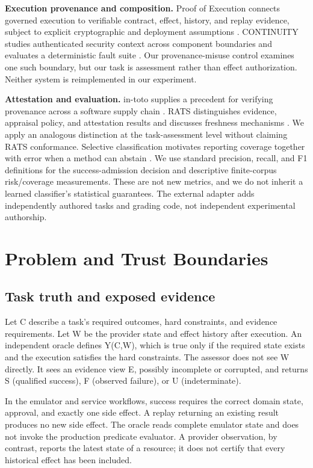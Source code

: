 \documentclass[11pt]{article}
\begin{document}
\textbf{Execution provenance and composition.} Proof of Execution connects governed execution to verifiable contract, effect, history, and replay evidence, subject to explicit cryptographic and deployment assumptions \cite{poe}. CONTINUITY studies authenticated security context across component boundaries and evaluates a deterministic fault suite \cite{continuity}. Our provenance-misuse control examines one such boundary, but our task is assessment rather than effect authorization. Neither system is reimplemented in our experiment.

\textbf{Attestation and evaluation.} in-toto supplies a precedent for verifying provenance across a software supply chain \cite{intoto}. RATS distinguishes evidence, appraisal policy, and attestation results and discusses freshness mechanisms \cite{rats}. We apply an analogous distinction at the task-assessment level without claiming RATS conformance. Selective classification motivates reporting coverage together with error when a method can abstain \cite{selective}. We use standard precision, recall, and F1 definitions \cite{metrics} for the success-admission decision and descriptive finite-corpus risk/coverage measurements. These are not new metrics, and we do not inherit a learned classifier's statistical guarantees. The external adapter adds independently authored tasks and grading code, not independent experimental authorship.

\section{Problem and Trust Boundaries}
\subsection{Task truth and exposed evidence}
Let C describe a task's required outcomes, hard constraints, and evidence requirements. Let W be the provider state and effect history after execution. An independent oracle defines Y(C,W), which is true only if the required state exists and the execution satisfies the hard constraints. The assessor does not see W directly. It sees an evidence view E, possibly incomplete or corrupted, and returns S (qualified success), F (observed failure), or U (indeterminate).

In the emulator and service workflows, success requires the correct domain state, approval, and exactly one side effect. A replay returning an existing result produces no new side effect. The oracle reads complete emulator state and does not invoke the production predicate evaluator. A provider observation, by contrast, reports the latest state of a resource; it does not certify that every historical effect has been included.
\end{document}
